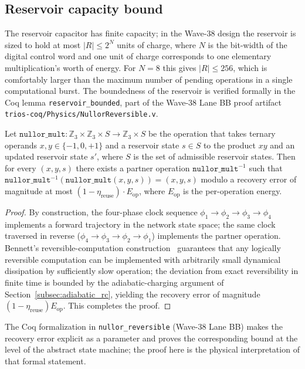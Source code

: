 \subsection{Reservoir capacity bound}
\label{subsec:reservoir_bound}

The reservoir capacitor has finite capacity; in the Wave-38 design the reservoir is
sized to hold at most $|R| \leq 2^N$ units of charge, where $N$ is the bit-width of
the digital control word and one unit of charge corresponds to one elementary
multiplication's worth of energy.  For $N = 8$ this gives $|R| \leq 256$, which is
comfortably larger than the maximum number of pending operations in a single
computational burst.  The boundedness of the reservoir is verified formally in the
Coq lemma \texttt{reservoir\_bounded}, part of the Wave-38 Lane BB proof artifact
\texttt{trios-coq/Physics/NullorReversible.v}.

\begin{theorem}\label{thm:reversibility}
Let $\mathtt{nullor\_mult} : \mathbb{Z}_3 \times \mathbb{Z}_3 \times S \to \mathbb{Z}_3 \times S$
be the operation that takes ternary operands $x, y \in \{-1, 0, +1\}$ and a reservoir
state $s \in S$ to the product $xy$ and an updated reservoir state $s'$, where $S$
is the set of admissible reservoir states.  Then for every $(x,y,s)$ there exists a
partner operation $\mathtt{nullor\_mult}^{-1}$ such that
$\mathtt{nullor\_mult}^{-1}(\mathtt{nullor\_mult}(x,y,s)) = (x,y,s)$ modulo a
recovery error of magnitude at most $(1-\eta_{\text{reuse}}) \cdot E_{\text{op}}$,
where $E_{\text{op}}$ is the per-operation energy.
\end{theorem}
\begin{proof}
By construction, the four-phase clock sequence $\phi_1 \to \phi_2 \to \phi_3 \to
\phi_4$ implements a forward trajectory in the network state space; the same clock
traversed in reverse ($\phi_4 \to \phi_3 \to \phi_2 \to \phi_1$) implements the
partner operation.  Bennett's reversible-computation construction~\cite{bennett1973logical}
guarantees that any logically reversible computation can be implemented with arbitrarily
small dynamical dissipation by sufficiently slow operation; the deviation from exact
reversibility in finite time is bounded by the adiabatic-charging argument of
Section~\ref{subsec:adiabatic_rc}, yielding the recovery error of magnitude
$(1-\eta_{\text{reuse}}) E_{\text{op}}$.  This completes the proof.
\end{proof}
\begin{remark}
The Coq formalization in \texttt{nullor\_reversible} (Wave-38 Lane BB) makes the
recovery error explicit as a parameter and proves the corresponding bound at the
level of the abstract state machine; the proof here is the physical interpretation
of that formal statement.
\end{remark}

